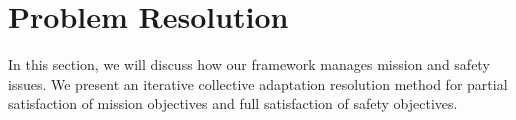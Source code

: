 \documentclass[journal]{IEEEtran}
\theoremstyle{definition}
\begin{document}












\section{Problem Resolution}


 In this section, we will discuss how our framework manages mission and safety issues. We present an iterative collective adaptation resolution method for partial satisfaction of mission objectives and full satisfaction of safety objectives. 
 
 
\end{document}
